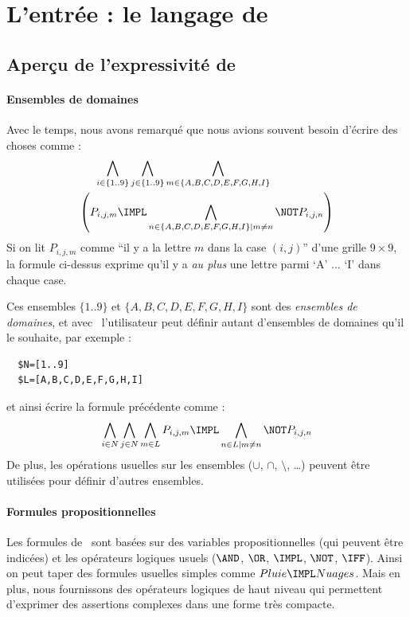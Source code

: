 \section{L'entrée : le langage de \touist}
\subsection{Aperçu de l'expressivité de \touist\label{sec:sat_tobedone}}

\paragraph{Ensembles de domaines}
Avec le temps, nous avons remarqué que nous avions souvent besoin d'écrire des choses comme :
$$\begin{aligned}\bigwedge_{i \in \{1..9\}} \bigwedge_{j \in \{1..9\}}\bigwedge_{ m\in \{A,B,C,D,E,F,G,H,I\}} \hspace{2cm}\\ \left( P_{i,j,m}\IMPL \bigwedge_{n \in \{A,B,C,D,E,F,G,H,I\}|m\neq n}\NOT P_{i,j,n}\right)\end{aligned}$$
Si on lit $P_{i,j,m}$ comme  ``il y a la lettre $m$ dans la case $(i,j)$'' d'une grille $9\times 9$, la formule ci-dessus exprime qu'il y a \emph{au plus} une lettre parmi `A' ... `I' dans chaque case.

Ces ensembles $\{1..9\}$ et $\{A,B,C,D,E,F,G,H,I\}$ sont des \emph{ensembles de domaines}, et avec \touist\ l'utilisateur peut définir autant d'ensembles de domaines qu'il le souhaite, par exemple :

\begin{verbatim}
  $N=[1..9]
  $L=[A,B,C,D,E,F,G,H,I]
\end{verbatim}

et ainsi écrire la formule précédente comme :
$$\bigwedge_{i \in N} \bigwedge_{j \in N}\bigwedge_{ m\in L}P_{i,j,m}\IMPL \bigwedge_{n \in L|m\neq n}\NOT P_{i,j,n}$$
De plus, les opérations usuelles sur les ensembles ($\cup$, $\cap$, $\setminus$, \ldots) peuvent être utilisées pour définir d'autres ensembles.


\paragraph{Formules propositionnelles}

Les formules de \touist\ sont basées sur des variables propositionnelles (qui peuvent être indicées) et les opérateurs logiques usuels ($\AND$, $\OR$, $\IMPL$, $\NOT$, $\IFF$). Ainsi on peut taper des formules usuelles simples comme $Pluie \IMPL Nuages$. Mais en plus, nous fournissons des opérateurs logiques de haut niveau qui permettent d'exprimer des assertions complexes dans une forme très compacte.

